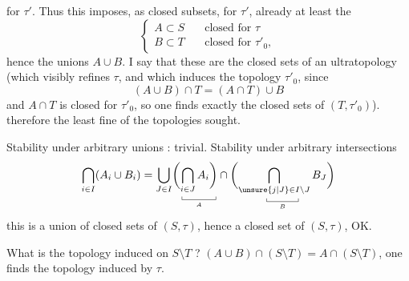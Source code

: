 for $ \tau'$. Thus this imposes, as closed subsets, for $\tau'$, already at least the
\[
\left\{\begin{aligned}
 A\subset S&\quad\text{closed for }\tau\\
 B\subset T&\quad\text{closed for }\tau'_0,
\end{aligned}\right.
\]
hence the unions $A\cup B$. I say that these are  the closed sets of an ultratopology (which visibly refines $\tau$, and which induces the topology $\tau'_0$, since
\[
 (A\cup B)\cap T=(A\cap T)\cup B
\]
and $A\cap T$ is closed for $\tau'_0$, so one finds exactly the closed sets of $(T,\tau'_0)$).
 therefore the  least fine of the topologies sought.

 Stability under arbitrary unions : trivial. Stability under arbitrary intersections
\[
 \bigcap_{i\in I}(A_i\cup B_i)=
 \bigcup_{J\in I}
 \biggl(\underset{\underset{A}{\rule{.35pt}{.3em}\rule{3em}{.35pt}\rule{.35pt}{.3em}}}{\bigcap_{i\in J}A_i\biggr)}
 \cap\biggl(\underset{\underset{B}{\rule{.35pt}{.3em}\rule{2.8em}{.35pt}\rule{.35pt}{.3em}}}{\bigcap_{\unsure{j|J}\in I\setminus J} B_J}\biggr)
\]
this is a union of closed sets of $(S,\tau)$, hence a closed set of $(S,\tau)$, OK.

What is the topology induced  on $S\setminus T$ ? $(A\cup B)\cap(S\setminus T)=A\cap(S\setminus T)$, one finds the topology induced by $\tau$.

